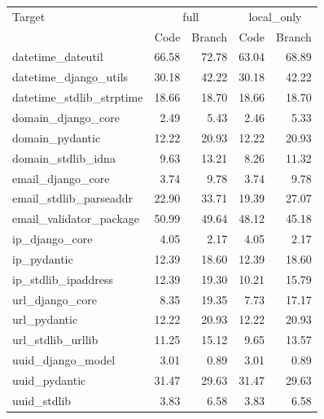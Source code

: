 \begin{tabular}{lrrrr}
\toprule
Target & \multicolumn{2}{c}{full} & \multicolumn{2}{c}{local\_only} \\
 & Code & Branch & Code & Branch \\
\midrule
datetime\_dateutil & 66.58 & 72.78 & 63.04 & 68.89 \\
datetime\_django\_utils & 30.18 & 42.22 & 30.18 & 42.22 \\
datetime\_stdlib\_strptime & 18.66 & 18.70 & 18.66 & 18.70 \\
domain\_django\_core & 2.49 & 5.43 & 2.46 & 5.33 \\
domain\_pydantic & 12.22 & 20.93 & 12.22 & 20.93 \\
domain\_stdlib\_idna & 9.63 & 13.21 & 8.26 & 11.32 \\
email\_django\_core & 3.74 & 9.78 & 3.74 & 9.78 \\
email\_stdlib\_parseaddr & 22.90 & 33.71 & 19.39 & 27.07 \\
email\_validator\_package & 50.99 & 49.64 & 48.12 & 45.18 \\
ip\_django\_core & 4.05 & 2.17 & 4.05 & 2.17 \\
ip\_pydantic & 12.39 & 18.60 & 12.39 & 18.60 \\
ip\_stdlib\_ipaddress & 12.39 & 19.30 & 10.21 & 15.79 \\
url\_django\_core & 8.35 & 19.35 & 7.73 & 17.17 \\
url\_pydantic & 12.22 & 20.93 & 12.22 & 20.93 \\
url\_stdlib\_urllib & 11.25 & 15.12 & 9.65 & 13.57 \\
uuid\_django\_model & 3.01 & 0.89 & 3.01 & 0.89 \\
uuid\_pydantic & 31.47 & 29.63 & 31.47 & 29.63 \\
uuid\_stdlib & 3.83 & 6.58 & 3.83 & 6.58 \\
\bottomrule
\end{tabular}
